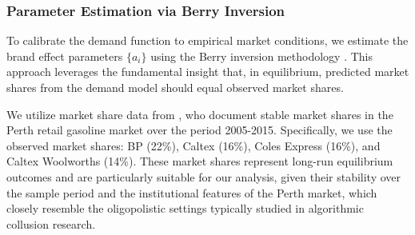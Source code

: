 





\subsubsection*{Parameter Estimation via Berry Inversion}

To calibrate the demand function to empirical market conditions, we estimate the brand effect parameters $\{a_i\}$ using the Berry inversion methodology \parencite{berry_estimating_1994}. This approach leverages the fundamental insight that, in equilibrium, predicted market shares from the demand model should equal observed market shares.

We utilize market share data from \textcite{byrne_learning_2019}, who document stable market shares in the Perth retail gasoline market over the period 2005-2015. Specifically, we use the observed market shares: BP (22\%), Caltex (16\%), Coles Express (16\%), and Caltex Woolworths (14\%). These market shares represent long-run equilibrium outcomes and are particularly suitable for our analysis, given their stability over the sample period and the institutional features of the Perth market, which closely resemble the oligopolistic settings typically studied in algorithmic collusion research.

